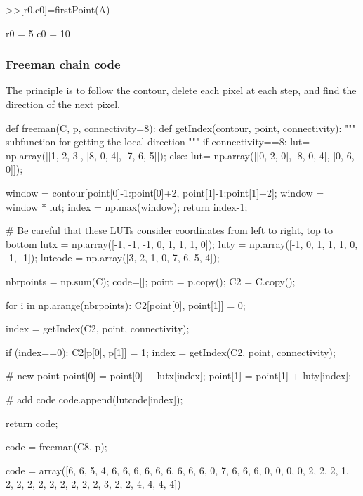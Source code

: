 \begin{sh}
>>[r0,c0]=firstPoint(A)

r0 =
     5
c0 =
    10
\end{sh}

\subsubsection{Freeman chain code}
The principle is to follow the contour, delete each pixel at each step, and find the direction of the next pixel.
\begin{python}
def freeman(C, p, connectivity=8):
    def getIndex(contour, point, connectivity):
        """ subfunction for getting the local direction
        """   
        if connectivity==8:
            lut= np.array([[1, 2, 3], [8, 0, 4], [7, 6, 5]]);
        else:
            lut= np.array([[0, 2, 0], [8, 0, 4], [0, 6, 0]]);

        window = contour[point[0]-1:point[0]+2, point[1]-1:point[1]+2];
        window = window * lut;
        index  = np.max(window);
        return index-1;
    
    
    # Be careful that these LUTs consider coordinates from left to right, top to bottom    
    lutx = np.array([-1, -1, -1, 0, 1, 1, 1, 0]);
    luty = np.array([-1, 0, 1, 1, 1, 0, -1, -1]);
    lutcode = np.array([3, 2, 1, 0, 7, 6, 5, 4]);
    
    nbrpoints = np.sum(C);
    code=[];
    point = p.copy();
    C2 = C.copy();

    for i in np.arange(nbrpoints):
        C2[point[0], point[1]] = 0;

        index = getIndex(C2, point, connectivity);
        
        if (index==0):
            C2[p[0], p[1]] = 1;
            index = getIndex(C2, point, connectivity);
            
        # new point
        point[0] = point[0] + lutx[index];
        point[1] = point[1] + luty[index];
        
        # add code
        code.append(lutcode[index]);
    
    return code;
\end{python}

\begin{python}
code = freeman(C8, p);
\end{python}

\begin{sh}
code = array([6, 6, 5, 4, 6, 6, 6, 6, 6, 6, 6, 6, 6, 0, 7, 6, 6, 6, 0, 0, 0, 0, 2, 2, 2, 1, 2, 2, 2, 2, 2, 2, 2, 2, 2, 3, 2, 2, 4, 4, 4, 4])
\end{sh}


